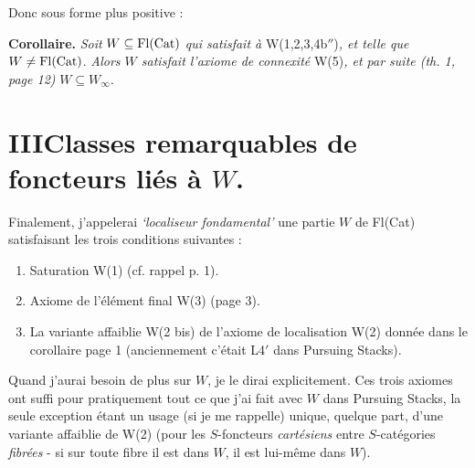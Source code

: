 Donc sous forme plus positive :

\textbf{Corollaire.} \textit{Soit} $W \subseteq \mathrm{Fl}(\mathrm{Cat})$ \textit{qui satisfait à} W(1,2,3,4b$''$)\textit{, et telle que} $W \neq \mathrm{Fl}(\mathrm{Cat})$. \textit{Alors $W$ satisfait l'axiome de connexité} W(5)\textit{, et par suite (th. 1, page 12)} $W \subseteq W_\infty$.


\section*{III\quad Classes remarquables de foncteurs liés à $W$.}

Finalement, j'appelerai \textit{‘localiseur fondamental’} une partie $W$ de Fl(Cat) satisfaisant les trois conditions suivantes : %

\begin{enumerate}
\item[(i)] Saturation W(1) (cf. rappel p. 1).
\item[(ii)] Axiome de l'élément final W(3) (page 3).
\item[(iii)] La variante affaiblie W(2 bis) de l'axiome de localisation W(2) donnée dans le corollaire page 1 (anciennement c'était L4$'$ dans Pursuing Stacks).
\end{enumerate}

Quand j'aurai besoin de plus sur $W$, je le dirai explicitement. Ces trois axiomes ont suffi pour pratiquement tout ce que j'ai fait avec $W$ dans Pursuing Stacks, la seule exception étant un usage (si je me rappelle) unique, quelque part, d'une variante affaiblie de W(2) (pour les $S$-foncteurs \textit{cartésiens} entre $S$-catégories \textit{fibrées} - si sur toute fibre il est dans $W$, il est lui-même dans $W$).

